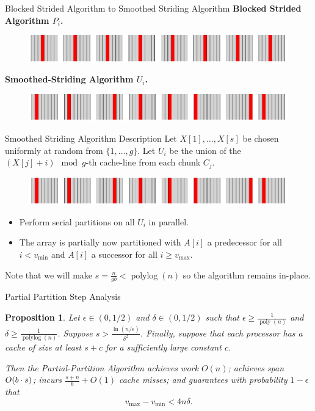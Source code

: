 \documentclass[x11names, svgnames, rgb]{beamer}
\DeclarePairedDelimiter{\paren}{(}{)}
\newcommand{\poly}{\operatorname{poly}}
\newcommand{\polylog}{\operatorname{polylog}}
\newtheorem{proposition}{Proposition}
\begin{document}
\begin{frame}[t]{Blocked Strided Algorithm to Smoothed Striding Algorithm} %
	\textbf{Blocked Strided Algorithm $P_i$.}
	\begin{figure}
		\includegraphics[width=\linewidth]{imgs/stridedAlgHighlighted.png}
	\end{figure}
	\textbf{Smoothed-Striding Algorithm $U_i$.}
	\begin{figure}
		\includegraphics[width=\linewidth]{imgs/smoothedStridingAlgHighlighted.png}
	\end{figure}
\end{frame}

\begin{frame}[t]{Smoothed Striding Algorithm Description}
	Let $X[1],\ldots, X[s]$ be chosen uniformly at random from $\{1,\ldots, g\}$. Let $U_i$ be the union of the $(X[j]+i)\mod g$-th cache-line from each chunk $C_j$.
	\begin{figure}
		\includegraphics[width=\linewidth]{imgs/smoothedStridingAlgHighlighted.png}
	\end{figure}
	\begin{itemize}
		\item Perform serial partitions on all $U_i$ in parallel.
		\item The array is partially now partitioned with $A[i]$ a predecessor for all $i < v_{\text{min}}$ and $A[i]$ a successor for all $i \ge v_{\text{max}}$.
	\end{itemize}
	Note that we will make $s = \frac{n}{gb} < \polylog(n)$ so the algorithm remains in-place.
\end{frame}


\begin{frame}[t]{Partial Partition Step Analysis}
\begin{proposition}
  Let $\epsilon \in (0, 1/2)$ and $\delta \in (0, 1/2)$ such that
  $\epsilon \ge \frac{1}{\poly(n)}$ and $\delta \ge
  \frac{1}{\polylog(n)}$. Suppose $s > \frac{\ln
    (n/\epsilon)}{\delta^2}$. Finally, suppose that each processor has
  a cache of size at least $s + c$ for a sufficiently large constant
  $c$.

  Then the Partial-Partition Algorithm achieves work $O(n)$; achieves
  span $O\paren*{b \cdot s}$; incurs $\frac{s+n}{b} + O(1)$ cache
  misses; and guarantees with probability $1 - \epsilon$ that
  $$v_{\text{max}}-v_{\text{min}} < 4 n \delta.$$
\end{proposition}

\end{frame}
\end{document}
